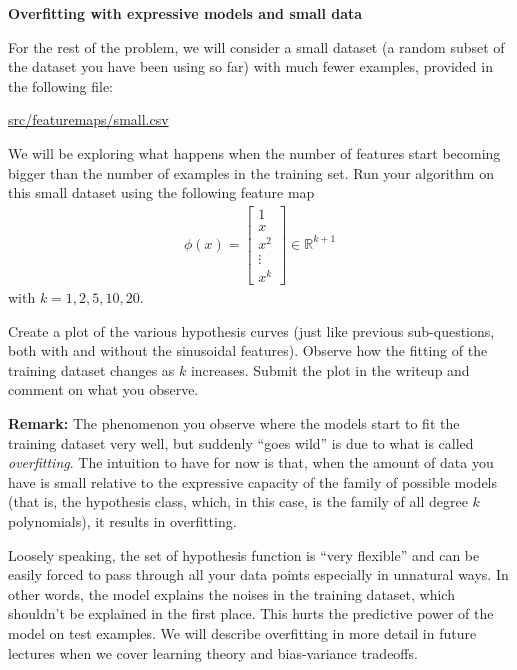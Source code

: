 \item {} {\bf Overfitting with expressive models and small data}

For the rest of the problem, we will consider a small
dataset (a random subset of the dataset you have been using so far) with much fewer examples, provided in
the following file:
%
\begin{center}
	\url{src/featuremaps/small.csv}
\end{center}
%

We will be exploring what happens when the number of features start becoming bigger than the number of 
examples in the training set. Run your algorithm on this small dataset using the following feature map 
\begin{align}
\phi(x) = \left[\begin{array}{c} 1\\ x \\ x^2\\ \vdots \\x^k \end{array}\right]\in \mathbb{R}^{k+1} 
\end{align}
with $k = 1,2,5,10,20$. 

Create a plot of the various hypothesis curves (just like previous sub-questions, both with and without the sinusoidal features). Observe how the fitting of the training dataset changes as $k$ increases. Submit the plot in the writeup and comment on what you observe.

\textbf{Remark: } The phenomenon you observe where the models start to fit the training dataset very well, but suddenly ``goes wild'' is due to what is called \emph{overfitting}. The intuition to have for now is that, when the amount of data you have is small relative to the expressive capacity of the family of possible models (that is, the hypothesis class, which, in this case, is the family of all degree $k$ polynomials), it results in overfitting.  

Loosely speaking, the set of hypothesis function is ``very flexible'' and can be easily forced to pass through all your data points especially in unnatural ways. In other words, the  model explains the noises in the training dataset, which shouldn't be explained in the first place. This hurts the predictive power of the model on test examples. We will describe overfitting in more detail in future lectures when we cover learning theory and bias-variance tradeoffs.\\

